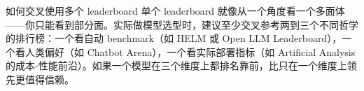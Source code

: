 \begin{knowledgebox}{如何交叉使用多个 leaderboard}
单个 leaderboard 就像从一个角度看一个多面体——你只能看到部分面。实际做模型选型时，建议至少交叉参考两到三个不同哲学的排行榜：一个看自动 benchmark（如 HELM 或 Open LLM Leaderboard），一个看人类偏好（如 Chatbot Arena），一个看实际部署指标（如 Artificial Analysis 的成本-性能前沿）。如果一个模型在三个维度上都排名靠前，比只在一个维度上领先更值得信赖。
\end{knowledgebox}

